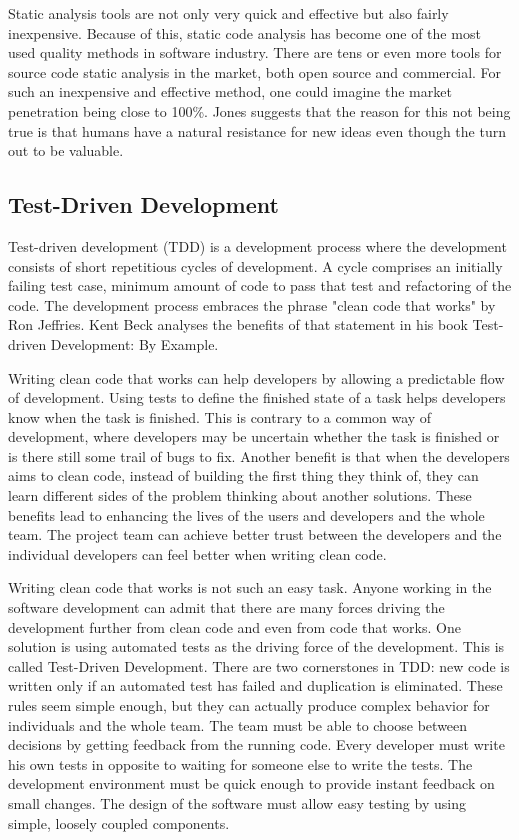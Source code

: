 Static analysis tools are not only very quick and effective but also fairly inexpensive. Because of this, static code analysis has become one of the most used quality methods in software industry. There are tens or even more tools for source code static analysis in the market, both open source and commercial. For such an inexpensive and effective method, one could imagine the market penetration being close to 100\%. Jones suggests that the reason for this not being true is that humans have a natural resistance for new ideas even though the turn out to be valuable.


\subsection{Test-Driven Development} 
Test-driven development (TDD) is a development process where the development consists of short repetitious cycles of development. A cycle comprises an initially failing test case, minimum amount of code to pass that test and refactoring of the code. The development process embraces the phrase "clean code that works" by Ron Jeffries. Kent Beck analyses the benefits of that statement in his book Test-driven Development: By Example.~\cite{beck2003test}

Writing clean code that works can help developers by allowing a predictable flow of development. Using tests to define the finished state of a task helps developers know when the task is finished. This is contrary to a common way of development, where developers may be uncertain whether the task is finished or is there still some trail of bugs to fix. Another benefit is that when the developers aims to clean code, instead of building the first thing they think of, they can learn different sides of the problem thinking about another solutions. These benefits lead to enhancing the lives of the users and developers and the whole team. The project team can achieve better trust between the developers and the individual developers can feel better when writing clean code.~\cite{beck2003test}

Writing clean code that works is not such an easy task. Anyone working in the software development can admit that there are many forces driving the development further from clean code and even from code that works. One solution is using automated tests as the driving force of the development. This is called Test-Driven Development. There are two cornerstones in TDD: new code is written only if an automated test has failed and duplication is eliminated. These rules seem simple enough, but they can actually produce complex behavior for individuals and the whole team. The team must be able to choose between decisions by getting feedback from the running code. Every developer must write his own tests in opposite to waiting for someone else to write the tests. The development environment must be quick enough to provide instant feedback on small changes. The design of the software must allow easy testing by using simple, loosely coupled components.~\cite{beck2003test}

